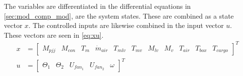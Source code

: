 The variables are differentiated in the differential equations in \cref{sec:mod_comp_mod}, are the system states. These are combined as a state vector $x$. The controlled inputs are likewise combined in the input vector $u$. These vectors are seen in \cref{eq:xu}.
\begin{equation}  \label{eq:xu}
	\begin{split}
		x &= \begin{bmatrix}
			M_{pjj}				&		%
			M_{con} 			&		%
			T_m 				&		%
			\dot{m}_{air}		&		%
			T_{mlv}				&		%
			T_{mv}				&		%
			M_{lv}				&		%
			M_v					&		%
			T_{air}				&		%
			T_{box}				&		%
			T_{cargo}					%
		\end{bmatrix}^T \\
		u &= \begin{bmatrix}
			\Theta_1			&			%
			\Theta_2 			&			%
			U_{fan_1}			&			%
			U_{fan_2}			&			%
			\omega							%
		\end{bmatrix}^T
	\end{split}
\end{equation}


